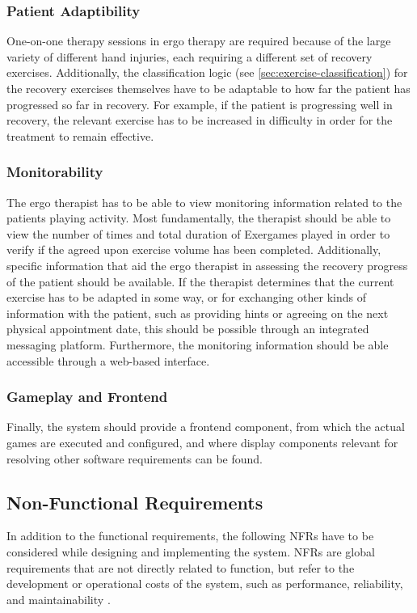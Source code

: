 \subsubsection{Patient Adaptibility}
One-on-one therapy sessions in ergo therapy are required because of the large variety of different hand injuries, each requiring a different set of recovery exercises. Additionally, the classification logic (see \ref{sec:exercise-classification}) for the recovery exercises themselves have to be adaptable to how far the patient has progressed so far in recovery. For example, if the patient is progressing well in recovery, the relevant exercise has to be increased in difficulty in order for the treatment to remain effective.

\subsubsection{Monitorability}
\label{sec:req:monitorability}
The ergo therapist has to be able to view monitoring information related to the patients playing activity. Most fundamentally, the therapist should be able to view the number of times and total duration of Exergames played in order to verify if the agreed upon exercise volume has been completed. Additionally, specific information that aid the ergo therapist in assessing the recovery progress of the patient should be available. If the therapist determines that the current exercise has to be adapted in some way, or for exchanging other kinds of information with the patient, such as providing hints or agreeing on the next physical appointment date, this should be possible through an integrated messaging platform. Furthermore, the monitoring information should be able accessible through a web-based interface.

\subsubsection{Gameplay and Frontend}
\label{sec:gameplay}
Finally, the system should provide a frontend component, from which the actual games are executed and configured, and where display components relevant for resolving other software requirements can be found.

\subsection{Non-Functional Requirements}
In addition to the functional requirements, the following \glspl{NFR} have to be considered while designing and implementing the system. \glspl{NFR} are global requirements that are not directly related to function, but refer to the development or operational costs of the system, such as performance, reliability, and maintainability \cite{chung2012non}.

